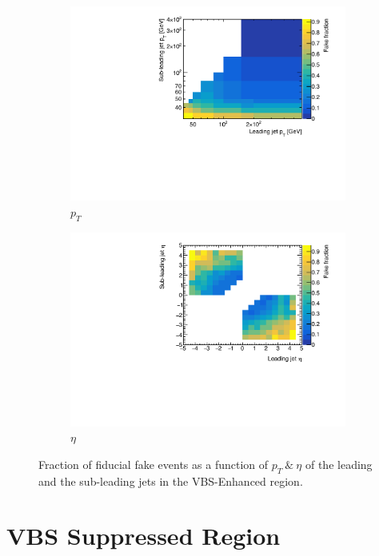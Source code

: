 \begin{figure}[htb]
    \centering
    \begin{subfigure}{.48\textwidth}
        \centering
        \includegraphics[width=.9\linewidth]{figures/Analysis/Unfolding/FakeFraction_pt_jets.pdf}
        \caption{ $p_{T}$}
    \end{subfigure}
    \begin{subfigure}{.48\textwidth}
        \centering
        \includegraphics[width=.9\linewidth]{figures/Analysis/Unfolding/FakeFraction_eta_jets.pdf}
        \caption{$\eta$}
    \end{subfigure}
    \caption{ Fraction of fiducial fake events as a function of $p_{T}~\&~\eta$ of the leading and the sub-leading jets in the VBS-Enhanced region.\label{fig:fake_fraction_jets}}
\end{figure}

\section{VBS Suppressed Region}
\label{Appendix:VBSSupRegion}
